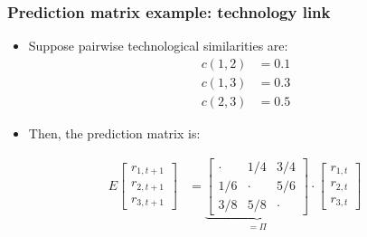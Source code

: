 \documentclass[10pt]{beamer}
\begin{document}
\begin{frame}[label=Pi_tech]
\frametitle{Prediction matrix example: technology link}
\begin{itemize}
\item Suppose pairwise technological similarities are:
\begin{align*}
c(1,2) & = 0.1 \\
c(1,3) & = 0.3 \\ 
c(2,3) & = 0.5
\end{align*}
\item Then, the prediction matrix is:
\end{itemize}

\begin{align*}
E\begin{bmatrix} r_{1,t+1} \\ r_{2,t+1} \\ r_{3,t+1} \end{bmatrix} & = \underbrace{\begin{bmatrix} \cdot & 1/4 & 3/4 \\
1/6 & \cdot & 5/6 \\ 
3/8 & 5/8 & \cdot
\end{bmatrix}}_{= \Pi} \cdot \begin{bmatrix} r_{1,t} \\ r_{2,t} \\ r_{3,t}\end{bmatrix}
\end{align*}

~\hfill \hyperlink{Pi}{}
\end{frame}
\end{document}
